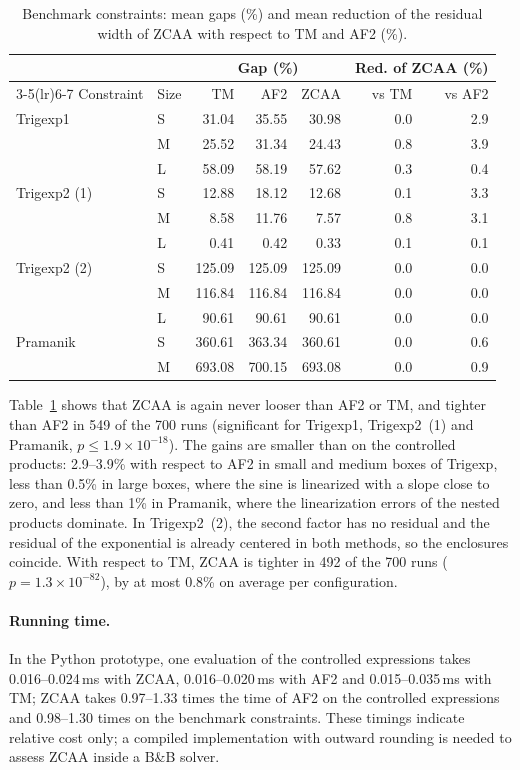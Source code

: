 \documentclass[10pt]{article}
\begin{document}
\begin{table}[t]
\centering
\caption{Benchmark constraints: mean gaps (\%) and mean reduction of the residual width of ZCAA with respect to TM and AF2 (\%).}
\label{tab:instances}
\small
\begin{tabular}{llrrrrr}
\toprule
 & & \multicolumn{3}{c}{Gap (\%)} & \multicolumn{2}{c}{Red. of ZCAA (\%)} \\
\cmidrule(lr){3-5}\cmidrule(lr){6-7}
Constraint & Size & TM & AF2 & ZCAA & vs TM & vs AF2 \\
\midrule
Trigexp1 & S & 31.04 & 35.55 & 30.98 & 0.0 & 2.9 \\
 & M & 25.52 & 31.34 & 24.43 & 0.8 & 3.9 \\
 & L & 58.09 & 58.19 & 57.62 & 0.3 & 0.4 \\
\midrule
Trigexp2 (1) & S & 12.88 & 18.12 & 12.68 & 0.1 & 3.3 \\
 & M & 8.58 & 11.76 & 7.57 & 0.8 & 3.1 \\
 & L & 0.41 & 0.42 & 0.33 & 0.1 & 0.1 \\
\midrule
Trigexp2 (2) & S & 125.09 & 125.09 & 125.09 & 0.0 & 0.0 \\
 & M & 116.84 & 116.84 & 116.84 & 0.0 & 0.0 \\
 & L & 90.61 & 90.61 & 90.61 & 0.0 & 0.0 \\
\midrule
Pramanik & S & 360.61 & 363.34 & 360.61 & 0.0 & 0.6 \\
 & M & 693.08 & 700.15 & 693.08 & 0.0 & 0.9 \\
\bottomrule
\end{tabular}
\end{table}

Table~\ref{tab:instances} shows that ZCAA is again never looser than AF2 or TM, and tighter than AF2 in 549 of the 700 runs (significant for Trigexp1, Trigexp2~(1) and Pramanik, $p\le 1.9\times10^{-18}$). The gains are smaller than on the controlled products: 2.9--3.9\% with respect to AF2 in small and medium boxes of Trigexp, less than 0.5\% in large boxes, where the sine is linearized with a slope close to zero, and less than 1\% in Pramanik, where the linearization errors of the nested products dominate. In Trigexp2~(2), the second factor has no residual and the residual of the exponential is already centered in both methods, so the enclosures coincide. With respect to TM, ZCAA is tighter in 492 of the 700 runs ($p=1.3\times10^{-82}$), by at most 0.8\% on average per configuration.

\paragraph{Running time.} In the Python prototype, one evaluation of the controlled expressions takes 0.016--0.024\,ms with ZCAA, 0.016--0.020\,ms with AF2 and 0.015--0.035\,ms with TM; ZCAA takes 0.97--1.33 times the time of AF2 on the controlled expressions and 0.98--1.30 times on the benchmark constraints. These timings indicate relative cost only; a compiled implementation with outward rounding is needed to assess ZCAA inside a B\&B solver.
\end{document}
